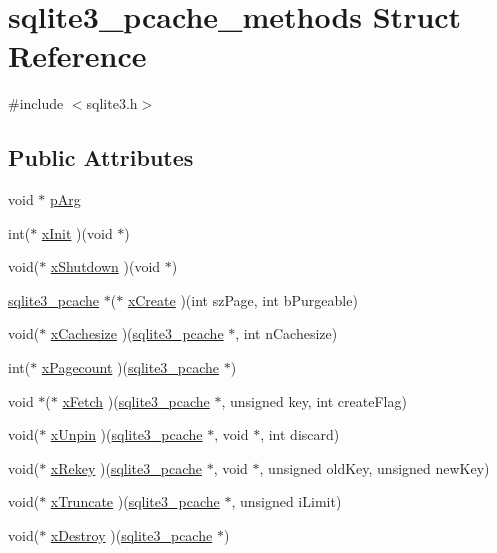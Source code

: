 \hypertarget{structsqlite3__pcache__methods}{\section{sqlite3\-\_\-pcache\-\_\-methods Struct Reference}
\label{structsqlite3__pcache__methods}
}


{\ttfamily \#include $<$sqlite3.\-h$>$}

\subsection*{Public Attributes}
\begin{DoxyCompactItemize}
\item 
void $\ast$ \hyperlink{structsqlite3__pcache__methods_a90394a920f6a09dd13553aeb79bbed88}{p\-Arg}
\item 
int($\ast$ \hyperlink{structsqlite3__pcache__methods_ab5f54101f6060de1af0c87b2456231ad}{x\-Init} )(void $\ast$)
\item 
void($\ast$ \hyperlink{structsqlite3__pcache__methods_aa88bb238d288631e7e06f4da232c3dbb}{x\-Shutdown} )(void $\ast$)
\item 
\hyperlink{sqlite3_8c_a096c453d937d51f7926d7d31c8e0bd2f}{sqlite3\-\_\-pcache} $\ast$($\ast$ \hyperlink{structsqlite3__pcache__methods_a36b1da95aeb7972c3c0d358aedf2a3d4}{x\-Create} )(int sz\-Page, int b\-Purgeable)
\item 
void($\ast$ \hyperlink{structsqlite3__pcache__methods_a9cf385dbec7f0d19793e2616a73a3b7f}{x\-Cachesize} )(\hyperlink{sqlite3_8c_a096c453d937d51f7926d7d31c8e0bd2f}{sqlite3\-\_\-pcache} $\ast$, int n\-Cachesize)
\item 
int($\ast$ \hyperlink{structsqlite3__pcache__methods_a0ab192dc811798e8f17c445dbf379989}{x\-Pagecount} )(\hyperlink{sqlite3_8c_a096c453d937d51f7926d7d31c8e0bd2f}{sqlite3\-\_\-pcache} $\ast$)
\item 
void $\ast$($\ast$ \hyperlink{structsqlite3__pcache__methods_a2e054ad70c9672b504d3d7291e4eb487}{x\-Fetch} )(\hyperlink{sqlite3_8c_a096c453d937d51f7926d7d31c8e0bd2f}{sqlite3\-\_\-pcache} $\ast$, unsigned key, int create\-Flag)
\item 
void($\ast$ \hyperlink{structsqlite3__pcache__methods_ade2ab50cc6896be03ee86541877fa85e}{x\-Unpin} )(\hyperlink{sqlite3_8c_a096c453d937d51f7926d7d31c8e0bd2f}{sqlite3\-\_\-pcache} $\ast$, void $\ast$, int discard)
\item 
void($\ast$ \hyperlink{structsqlite3__pcache__methods_adc5552190f1de86eb95d91e9cf8430e6}{x\-Rekey} )(\hyperlink{sqlite3_8c_a096c453d937d51f7926d7d31c8e0bd2f}{sqlite3\-\_\-pcache} $\ast$, void $\ast$, unsigned old\-Key, unsigned new\-Key)
\item 
void($\ast$ \hyperlink{structsqlite3__pcache__methods_aad73f9335999770bcd2dc6a2d914b4f0}{x\-Truncate} )(\hyperlink{sqlite3_8c_a096c453d937d51f7926d7d31c8e0bd2f}{sqlite3\-\_\-pcache} $\ast$, unsigned i\-Limit)
\item 
void($\ast$ \hyperlink{structsqlite3__pcache__methods_aac18fc581d8d63550a6657016c24ba5d}{x\-Destroy} )(\hyperlink{sqlite3_8c_a096c453d937d51f7926d7d31c8e0bd2f}{sqlite3\-\_\-pcache} $\ast$)
\end{DoxyCompactItemize}

